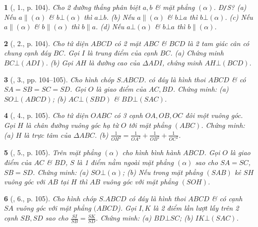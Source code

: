 \documentclass{article}
\newtheorem{baitoan}{}
\begin{document}
\begin{baitoan}[\cite{SGK_Toan_11_hinh_hoc_co_ban}, 1., p. 104]
	Cho 2 đường thẳng phân biệt $a,b$ \& mặt phẳng $(\alpha)$. \emph{Đ\texttt{/}S?} (a)  Nếu $a\parallel(\alpha)$ \& $b\bot(\alpha)$ thì $a\bot b$. (b) Nếu $a\parallel(\alpha)$ \& $b\bot a$ thì $b\bot(\alpha)$. (c) Nếu $a\parallel(\alpha)$ \& $b\parallel(\alpha)$ thì $b\parallel a$. (d) Nếu $a\bot(\alpha)$ \& $b\bot a$ thì $b\parallel(\alpha)$.
\end{baitoan}

\begin{baitoan}[\cite{SGK_Toan_11_hinh_hoc_co_ban}, 2., p. 104]
	Cho tứ diện $ABCD$ có 2 mặt $ABC$ \& $BCD$ là 2 tam giác cân có chung cạnh đáy $BC$. Gọi $I$ là trung điểm của cạnh $BC$. (a) Chứng minh $BC\bot(ADI)$. (b) Gọi $AH$ là đường cao của $\Delta ADI$, chứng minh $AH\bot(BCD)$.
\end{baitoan}

\begin{baitoan}[\cite{SGK_Toan_11_hinh_hoc_co_ban}, 3., pp. 104--105]
	Cho hình chóp $S.ABCD$. có đáy là hình thoi $ABCD$ \& có $SA = SB = SC = SD$. Gọi $O$ là giao điểm của $AC,BD$. Chứng minh: (a) $SO\bot(ABCD)$; (b) $AC\bot(SBD)$ \& $BD\bot(SAC)$.
\end{baitoan}

\begin{baitoan}[\cite{SGK_Toan_11_hinh_hoc_co_ban}, 4., p. 105]
	Cho tứ diện $OABC$ có 3 cạnh $OA,OB,OC$ đôi một vuông góc. Gọi $H$ là chân đường vuông góc hạ từ $O$ tới mặt phẳng $(ABC)$. Chứng minh: (a) $H$ là trực tâm của $\Delta ABC$. (b) $\frac{1}{OH^2} = \frac{1}{OA^2} + \frac{1}{OB^2} + \frac{1}{OC^2}$. 
\end{baitoan}

\begin{baitoan}[\cite{SGK_Toan_11_hinh_hoc_co_ban}, 5., p. 105]
	Trên mặt phẳng $(\alpha)$ cho hình bình hành $ABCD$. Gọi $O$ là giao điểm của $AC$ \& $BD$, $S$ là 1 điểm nằm ngoài mặt phẳng $(\alpha)$ sao cho $SA = SC$, $SB = SD$. Chứng minh: (a) $SO\bot(\alpha)$; (b) Nếu trong mặt phẳng $(SAB)$ kẻ $SH$ vuông góc với $AB$ tại $H$ thì $AB$ vuông góc với mặt phẳng $(SOH)$.
\end{baitoan}

\begin{baitoan}[\cite{SGK_Toan_11_hinh_hoc_co_ban}, 6., p. 105]
	Cho hình chóp $S.ABCD$ có đáy là hình thoi $ABCD$ \& có cạnh $SA$ vuông góc với mặt phẳng $(ABCD$). Gọi $I,K$ là 2 điểm lần lượt lấy trên 2 cạnh $SB,SD$ sao cho $\frac{SI}{SB} = \frac{SK}{SD}$. Chứng minh: (a) $BD\bot SC$; (b) $IK\bot(SAC)$.
\end{baitoan}
\end{document}
